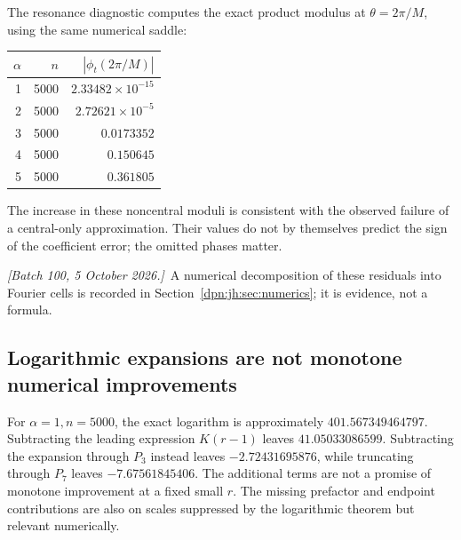 \documentclass[11pt]{article}
\numberwithin{equation}{section}
\theoremstyle{definition}\newtheorem{definition}[theorem]{Definition}
\theoremstyle{remark}\newtheorem{remark}[theorem]{Remark}
\newcommand{\writenoted}[1]{\par\smallskip\noindent\textit{[Batch 100, 5 October 2026.]}\ #1\par\smallskip}
\begin{document}
The resonance diagnostic computes the exact product modulus at
$\theta=2\pi/M$, using the same numerical saddle:
\begin{center}
\begin{tabular}{rrr}
\toprule
$\alpha$ & $n$ & $|\phi_t(2\pi/M)|$\\
\midrule
1 & 5000 & $2.33482\times10^{-15}$\\
2 & 5000 & $2.72621\times10^{-5}$\\
3 & 5000 & $0.0173352$\\
4 & 5000 & $0.150645$\\
5 & 5000 & $0.361805$\\
\bottomrule
\end{tabular}
\end{center}
The increase in these noncentral moduli is consistent with the observed
failure of a central-only approximation. Their values do not by themselves
predict the sign of the coefficient error; the omitted phases matter.
\writenoted{A numerical decomposition of these residuals into Fourier cells
is recorded in Section~\ref{dpn:jh:sec:numerics}; it is evidence, not a
formula.}

\subsection{Logarithmic expansions are not monotone numerical improvements}
For $\alpha=1,n=5000$, the exact logarithm is approximately
$401.567349464797$. Subtracting the leading expression $K(r-1)$ leaves
$41.05033086599$. Subtracting the expansion through $P_3$ instead leaves
$-2.72431695876$, while truncating through $P_7$ leaves $-7.67561845406$.
The additional terms are not a promise of monotone improvement at a fixed
small $r$. The missing prefactor and endpoint contributions are also on
scales suppressed by the logarithmic theorem but relevant numerically.
\end{document}
